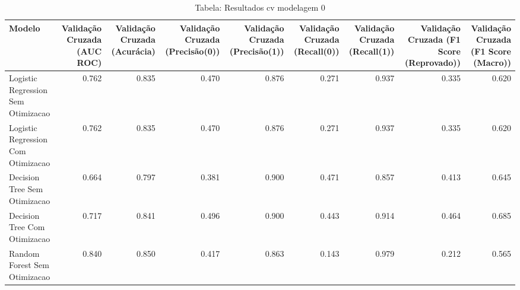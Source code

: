 \begin{table}[H] %
    \centering
    \caption{Tabela: Resultados cv modelagem 0}
    \label{tab:resultados_cv_modelagem_0}
    \renewcommand{\arraystretch}{1.25} %
    \begin{adjustwidth}{ -1in }{ -1in } %
    \centering %
    \small %
    \begin{tabular}{lrrrrrrrr}
\toprule
                            Modelo &  Validação Cruzada (AUC ROC) &  Validação Cruzada (Acurácia) &  Validação Cruzada (Precisão(0)) &  Validação Cruzada (Precisão(1)) &  Validação Cruzada (Recall(0)) &  Validação Cruzada (Recall(1)) &  Validação Cruzada (F1 Score (Reprovado)) &  Validação Cruzada (F1 Score (Macro)) \\
\midrule
Logistic Regression Sem Otimizacao &                        0.762 &                         0.835 &                            0.470 &                            0.876 &                          0.271 &                          0.937 &                                     0.335 &                                 0.620 \\
Logistic Regression Com Otimizacao &                        0.762 &                         0.835 &                            0.470 &                            0.876 &                          0.271 &                          0.937 &                                     0.335 &                                 0.620 \\
      Decision Tree Sem Otimizacao &                        0.664 &                         0.797 &                            0.381 &                            0.900 &                          0.471 &                          0.857 &                                     0.413 &                                 0.645 \\
      Decision Tree Com Otimizacao &                        0.717 &                         0.841 &                            0.496 &                            0.900 &                          0.443 &                          0.914 &                                     0.464 &                                 0.685 \\
      Random Forest Sem Otimizacao &                        0.840 &                         0.850 &                            0.417 &                            0.863 &                          0.143 &                          0.979 &                                     0.212 &                                 0.565 \\

\end{tabular}
\end{adjustwidth}
\end{table}
